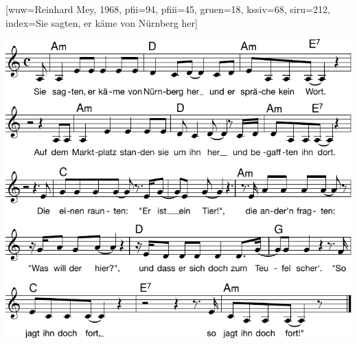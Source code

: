 [wuw={Reinhard Mey, 1968}, pfii={94}, pfiii={45}, gruen={18}, kssiv={68}, siru={212}, index={Sie sagten, er käme von Nürnberg her}]

\beginverse
\endverse
\centering\includegraphics[width=1\textwidth]{Noten/Lied059.pdf}	

